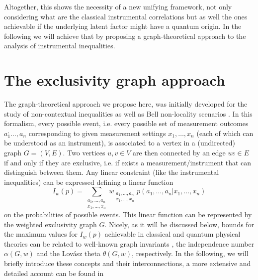 \documentclass[letterpaper]{article}
\newcommand{\avg}[1]{\langle#1\rangle}
\begin{document}
Altogether, this shows the necessity of a new unifying framework, not only
considering what are the classical instrumental correlations but as well the
ones achievable if the underlying latent factor might have a quantum origin. In
the following we will achieve that by proposing a graph-theoretical approach to
the analysis of instrumental inequalities.


\section*{The exclusivity graph approach}

The graph-theoretical approach we propose here, was initially developed for the
study of non-contextual inequalities \cite{cabello2014} as well as Bell
non-locality scenarios \cite{acin2015}. 
In this formalism, every possible event, i.e. every possible set of measurement
outcomes $a_1^,\ldots, a_n$ corresponding to given measurement settings
$x_1,\ldots,x_n$ (each of which can be understood as an instrument), is
associated to a vertex in a (undirected) graph $G = (V, E)$. Two vertices $u, v
\in V$ are then connected by an edge $uv \in E$ if and only if they are
exclusive, i.e.  if exists a measurement/instrument that can distinguish between
them. Any linear constraint (like the instrumental inequalities) can be
expressed defining a linear function
\begin{equation}
    I_w(p) = \sum_{\substack{a_1,\ldots,a_n\\x_1,\ldots,x_n}}
w_{\substack{a_1,\ldots,a_n\\x_1,\ldots,x_n}} p(a_1,\ldots,a_n|x_1,\ldots,x_n)
\end{equation}
on the probabilities of possible events. This linear function can be represented
by the weighted exclusivity graph $G$. Nicely, as it will be discussed below,
bounds for the maximum values for $ I_w(p)$ achievable in classical and quantum
physical theories can be related to well-known graph invariants \cite{}, the
independence number $\alpha(G, w)$ and the Lovász theta $\theta(G, w)$,
respectively. In the following, we will briefly introduce these concepts and
their interconnections, a more extensive and detailed account can be found in
\cite{cabello2014, rabelo2014,acin2015}
\end{document}
